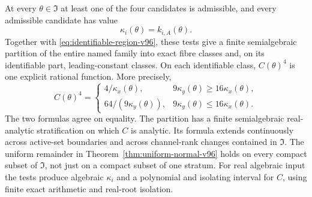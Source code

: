 \begin{theorem}
\label{thm:phase-partition-v96}
At every $\theta\in\mathfrak I$ at least one of the four candidates
is admissible, and every admissible candidate has value
\begin{equation}\label{eq:active-value-v96}
 \kappa_i(\theta)=k_{i,A}(\theta).
\end{equation}
Together with \eqref{eq:identifiable-region-v96}, these tests give a
finite semialgebraic partition of the entire named family into exact
fibre classes and, on its identifiable part, leading-constant classes.
On each identifiable class, $C(\theta)^4$ is one explicit rational
function. More precisely,
\begin{equation}\label{eq:fourth-power-v96}
 C(\theta)^4=
 \begin{cases}
 4/\kappa_x(\theta),&9\kappa_y(\theta)\ge16\kappa_x(\theta),\\
 64/(9\kappa_y(\theta)),&9\kappa_y(\theta)\le16\kappa_x(\theta).
 \end{cases}
\end{equation}
The two formulas agree on equality. The partition has a finite
semialgebraic real-analytic stratification on which $C$ is analytic.
Its formula extends continuously across active-set boundaries and
across channel-rank changes contained in $\mathfrak I$. The uniform
remainder in Theorem~\ref{thm:uniform-normal-v96} holds on every compact
subset of $\mathfrak I$, not just on a compact subset of one stratum.
For real algebraic input the tests produce algebraic $\kappa_i$ and a
polynomial and isolating interval for $C$, using finite exact arithmetic
and real-root isolation.
\end{theorem}
